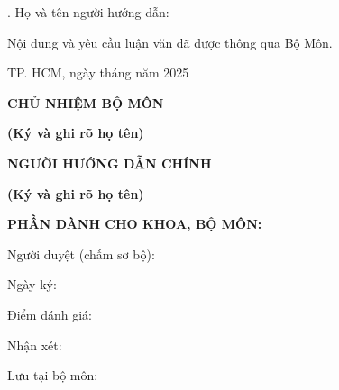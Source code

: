 \vspace{0.3cm}
. Họ và tên người hướng dẫn: \TENCANBO

\vspace{0.6cm}

\noindent
Nội dung và yêu cầu luận văn đã được thông qua Bộ Môn.

\vspace{0.4cm}

\noindent
\hfill TP. HCM, ngày \dotfill tháng \dotfill năm 2025

\vspace{1.5cm}

\begin{center}
\parbox{0.45\textwidth}{
    \centering
    \textbf{CHỦ NHIỆM BỘ MÔN}
    
    \vspace{2.0cm}
    
    \textbf{\small (Ký và ghi rõ họ tên)}
}
\hfill
\parbox{0.45\textwidth}{
    \centering
    \textbf{NGƯỜI HƯỚNG DẪN CHÍNH}
    
    \vspace{2.0cm}
    
    \textbf{\small (Ký và ghi rõ họ tên)}
}
\end{center}

\vspace{1.0cm}

\noindent
\textbf{PHẦN DÀNH CHO KHOA, BỘ MÔN:}

\vspace{0.3cm}

\noindent
\small Người duyệt (chấm sơ bộ): \dotfill

\vspace{0.2cm}
\noindent
\small Ngày ký: \dotfill

\vspace{0.2cm}
\noindent
\small Điểm đánh giá: \dotfill

\vspace{0.2cm}
\noindent
\small Nhận xét: \dotfill

\vspace{0.2cm}
\noindent
\phantom{Nhận xét: }\dotfill

\vspace{0.2cm}
\noindent
\small Lưu tại bộ môn: \dotfill
\cleardoublepage
